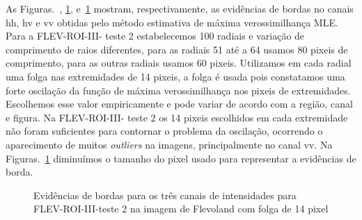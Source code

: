 As Figuras.~, \ref{evidencias_r3_2_hh_hv_vv}, e~\ref{evidencias_r3_2_hh_hv_vv} mostram, respectivamente, as evidências de bordas no canais hh, hv e vv obtidas pelo método estimativa de máxima verossimilhança MLE. Para a FLEV-ROI-III- teste 2 estabelecemos 100 radiais e variação de comprimento de raios diferentes, para as radiais 51 até a 64 usamos 80 pixeis de comprimento, para as outras radiais usamos 60 pixeis. Utilizamos em cada radial uma folga nas extremidades de  14 pixeis, a folga é usada pois constatamos uma forte oscilação da função de máxima verossimilhança nos pixeis de extremidades. Escolhemos esse valor empiricamente e pode variar de acordo com a região, canal e figura. Na FLEV-ROI-III- teste 2 os 14 pixeis escolhidos em cada extremidade não foram suficientes para contornar o problema da oscilação, ocorrendo o aparecimento de muitos \textit{outliers} na imagens, principalmente no canal vv. Na Figuras.~\ref{evidencias_r3_2_hh_hv_vv} diminuímos o tamanho do pixel usado para representar a evidências de borda.
   \begin{figure}[hbt]
	\centering
     \caption{Evidências de bordas para os três canais de intensidades para FLEV-ROI-III-teste 2 na imagem de Flevoland com folga de 14 pixel}
     \label{evidencias_r3_2_hh_hv_vv} 
   \end{figure}

